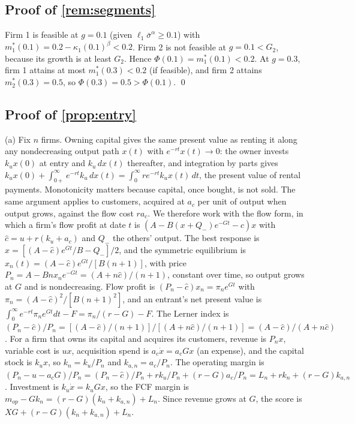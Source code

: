 \subsection*{Proof of \autoref{rem:segments}}

Firm 1 is feasible at $g=0.1$ (given $\ell_1\bar\sigma^{\alpha}\ge 0.1$) with $m_1^*(0.1)=0.2-\kappa_1(0.1)^{\beta}<0.2$. Firm 2 is not feasible at $g=0.1<G_2$, because its growth is at least $G_2$. Hence $\Phi(0.1)=m_1^*(0.1)<0.2$. At $g=0.3$, firm 1 attains at most $m_1^*(0.3)<0.2$ (if feasible), and firm 2 attains $m_2^*(0.3)=0.5$, so $\Phi(0.3)=0.5>\Phi(0.1)$. \qed

\subsection*{Proof of \autoref{prop:entry}}

(a) Fix $n$ firms. Owning capital gives the same present value as renting it along any nondecreasing output path $x(t)$ with $e^{-rt}x(t)\to0$: the owner invests $k_ux(0)$ at entry and $k_u\,dx(t)$ thereafter, and integration by parts gives $k_ux(0)+\int_{0+}^\infty e^{-rt}k_u\,dx(t)=\int_0^\infty re^{-rt}k_ux(t)\,dt$, the present value of rental payments. Monotonicity matters because capital, once bought, is not sold. The same argument applies to customers, acquired at $a_c$ per unit of output when output grows, against the flow cost $ra_c$. We therefore work with the flow form, in which a firm's flow profit at date $t$ is $(A-B(x+Q_-)e^{-Gt}-\hat c)x$ with $\hat c=u+r(k_u+a_c)$ and $Q_-$ the others' output. The best response is $x=[(A-\hat c)e^{Gt}/B-Q_-]/2$, and the symmetric equilibrium is $x_n(t)=(A-\hat c)e^{Gt}/[B(n+1)]$, with price $P_n=A-Bnx_ne^{-Gt}=(A+n\hat c)/(n+1)$, constant over time, so output grows at $G$ and is nondecreasing. Flow profit is $(P_n-\hat c)x_n=\pi_ne^{Gt}$ with $\pi_n=(A-\hat c)^2/[B(n+1)^2]$, and an entrant's net present value is $\int_0^\infty e^{-rt}\pi_ne^{Gt}dt-F=\pi_n/(r-G)-F$. The Lerner index is $(P_n-\hat c)/P_n=[(A-\hat c)/(n+1)]/[(A+n\hat c)/(n+1)]=(A-\hat c)/(A+n\hat c)$. For a firm that owns its capital and acquires its customers, revenue is $P_nx$, variable cost is $ux$, acquisition spend is $a_c\dot x=a_cGx$ (an expense), and the capital stock is $k_ux$, so $k_n=k_u/P_n$ and $k_{a,n}=a_c/P_n$. The operating margin is $(P_n-u-a_cG)/P_n=(P_n-\hat c)/P_n+rk_u/P_n+(r-G)a_c/P_n=L_n+rk_n+(r-G)k_{a,n}$. Investment is $k_u\dot x=k_uGx$, so the FCF margin is $m_{op}-Gk_n=(r-G)(k_n+k_{a,n})+L_n$. Since revenue grows at $G$, the score is $XG+(r-G)(k_n+k_{a,n})+L_n$.

